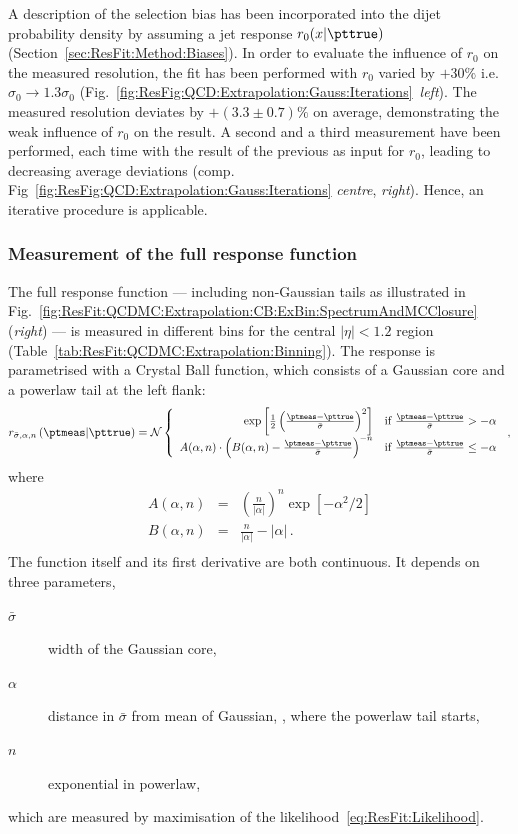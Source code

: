 A description of the selection bias has been incorporated into the dijet probability density by assuming a jet \pt response $r_{0}(x|\pttrue)$ (Section~\ref{sec:ResFit:Method:Biases}).
In order to evaluate the influence of $r_{0}$ on the measured resolution, the fit has been performed with $r_{0}$ varied by $+30\%$ i.e. $\sigma_{0}\rightarrow 1.3\sigma_{0}$ (Fig.~\ref{fig:ResFig:QCD:Extrapolation:Gauss:Iterations}~\textit{left}).
The measured resolution deviates by $+(3.3 \pm 0.7)\%$ on average, demonstrating the weak influence of $r_{0}$ on the result.
A second and a third measurement have been performed, each time with the result of the previous as input for $r_{0}$, leading to decreasing average deviations (comp. Fig~\ref{fig:ResFig:QCD:Extrapolation:Gauss:Iterations} \textit{centre}, \textit{right}).
Hence, an iterative procedure is applicable. 



\subsubsection{Measurement of the full response function}\label{sec:ResFit:QCDMC:CrystalBall}

The full response function --- including non-Gaussian tails as illustrated in Fig.~\ref{fig:ResFit:QCDMC:Extrapolation:CB:ExBin:SpectrumAndMCClosure} (\textit{right}) --- is measured in different \pt bins for the central $|\eta|<1.2$ region (Table~\ref{tab:ResFit:QCDMC:Extrapolation:Binning}).
The response is parametrised with a Crystal Ball function, which consists of a Gaussian core and a powerlaw tail at the left flank:
\begin{equation*}
  r_{\bar{\sigma},\alpha,n}\left(\ptmeas|\pttrue\right) = \mathcal{N}\left\{
    \begin{array}{rl}
      \exp\left[\frac{1}{2}\left(\frac{\ptmeas-\pttrue}{\bar{\sigma}}\right)^{2}\right] & \text{if }\frac{\ptmeas-\pttrue}{\bar{\sigma}} > -\alpha \\
      A(\alpha,n)\cdot\left(B(\alpha,n) - \frac{\ptmeas-\pttrue}{\bar{\sigma}}\right)^{-n} & \text{if }\frac{\ptmeas-\pttrue}{\bar{\sigma}} \leq -\alpha
    \end{array}
  \right.\,,
\end{equation*}
where
\begin{eqnarray*}
  A(\alpha,n) & = & \left(\frac{n}{|\alpha|}\right)^{n}\exp\left[-\alpha^{2}/2\right] \\
  B(\alpha,n) & = & \frac{n}{|\alpha|} - |\alpha|\,. \\
\end{eqnarray*} 
The function itself and its first derivative are both continuous.
It depends on three parameters,
\begin{description}
\item[$\bar{\sigma}$] width of the Gaussian core,
\item[$\alpha$] distance in $\bar{\sigma}$ from mean of Gaussian, \pttrue, where the powerlaw tail starts,
\item[$n$] exponential in powerlaw,
\end{description}
which are measured by maximisation of the likelihood~\eqref{eq:ResFit:Likelihood}.

